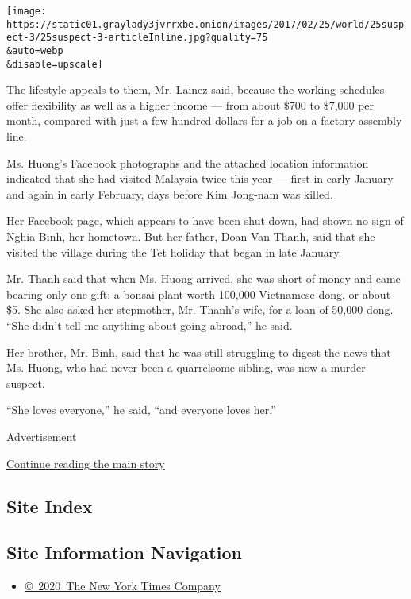 \texttt{[image: https://static01.graylady3jvrrxbe.onion/images/2017/02/25/world/25suspect-3/25suspect-3-articleInline.jpg?quality=75\\\&auto=webp\\\&disable=upscale]}

The lifestyle appeals to them, Mr. Lainez said, because the working
schedules offer flexibility as well as a higher income --- from about
\$700 to \$7,000 per month, compared with just a few hundred dollars for
a job on a factory assembly line.

Ms. Huong's Facebook photographs and the attached location information
indicated that she had visited Malaysia twice this year --- first in
early January and again in early February, days before Kim Jong-nam was
killed.

Her Facebook page, which appears to have been shut down, had shown no
sign of Nghia Binh, her hometown. But her father, Doan Van Thanh, said
that she visited the village during the Tet holiday that began in late
January.

Mr. Thanh said that when Ms. Huong arrived, she was short of money and
came bearing only one gift: a bonsai plant worth 100,000 Vietnamese
dong, or about \$5. She also asked her stepmother, Mr. Thanh's wife, for
a loan of 50,000 dong. ``She didn't tell me anything about going
abroad,'' he said.

Her brother, Mr. Binh, said that he was still struggling to digest the
news that Ms. Huong, who had never been a quarrelsome sibling, was now a
murder suspect.

``She loves everyone,'' he said, ``and everyone loves her.''

Advertisement

\protect\hyperlink{after-bottom}{Continue reading the main story}

\hypertarget{site-index}{%
\subsection{Site Index}\label{site-index}}

\hypertarget{site-information-navigation}{%
\subsection{Site Information
Navigation}\label{site-information-navigation}}

\begin{itemize}
\tightlist
\item
  \href{https://help.nytimes3xbfgragh.onion/hc/en-us/articles/115014792127-Copyright-notice}{©~2020~The
  New York Times Company}
\end{itemize}

